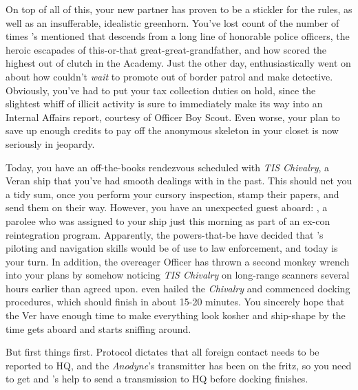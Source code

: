 \documentclass[char]{guildcamp4}
\begin{document}
On top of all of this, your new partner \cCgood{} has proven to be a stickler for the rules, as well as an insufferable, idealistic greenhorn. You've lost count of the number of times \cCgood{\they}'s mentioned that \cCgood{\they} descends from a long line of honorable police officers, the heroic escapades of this-or-that great-great-grandfather, and how \cCgood{\they} scored the highest out of \cCgood{\their} clutch in the Academy. Just the other day, \cCgood{\they} enthusiastically went on about how \cCgood{\they} couldn't \textit{wait} to promote out of border patrol and make detective. Obviously, you've had to put your tax collection duties on hold, since the slightest whiff of illicit activity is sure to immediately make its way into an Internal Affairs report, courtesy of Officer Boy Scout. Even worse, your plan to save up enough credits to pay off the anonymous skeleton in your closet is now seriously in jeopardy.

Today, you have an off-the-books rendezvous scheduled with \textit{TIS Chivalry}, a Veran ship that you've had smooth dealings with in the past. This should net you a tidy sum, once you perform your cursory inspection, stamp their papers, and send them on their way. However, you have an unexpected guest aboard: \cPilot{}, a parolee who was assigned to your ship just this morning as part of an ex-con reintegration program. Apparently, the powers-that-be have decided that \cPilot{}'s piloting and navigation skills would be of use to law enforcement, and today is your turn. In addition, the overeager Officer \cCgood{} has thrown a second monkey wrench into your plans by somehow noticing \textit{TIS Chivalry} on long-range scanners several hours earlier than agreed upon. \cCgood{\They} even hailed the \textit{Chivalry} and commenced docking procedures, which should finish in about 15-20 minutes. You sincerely hope that the Ver have enough time to make everything look kosher and ship-shape by the time \cCgood{} gets aboard and starts sniffing around.

But first things first. Protocol dictates that all foreign contact needs to be reported to HQ, and the \emph{Anodyne}'s transmitter has been on the fritz, so you need to get \cCgood{} and \cCbad{}'s help to send a transmission to HQ before docking finishes.
\end{document}
